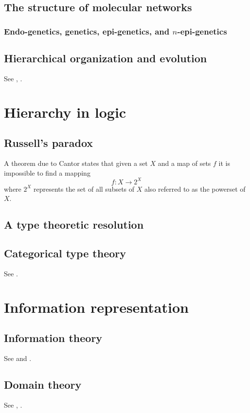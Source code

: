 \documentclass[aps,twocolumn]{revtex4}
\begin{document}
\subsection{The structure of molecular networks}
\subsubsection{Endo-genetics, genetics, epi-genetics, and $n$-epi-genetics}
\subsection{Hierarchical organization and evolution}
See \cite{Gould1994}, \cite{Arnold1982}.

\section{Hierarchy in logic}

\subsection{Russell's paradox}
A theorem due to Cantor states that given a set $X$ and a map of sets $f$ it is impossible to find a mapping $$ f: X \rightarrow 2^X $$ where $2^X$ represents the set of all subsets of $X$ also referred to as the powerset of $X$.

\subsection{A type theoretic resolution}

\subsection{Categorical type theory}
See \cite{Crole1994a}.

\section{Information representation}

\subsection{Information theory}
See \cite{Ellerman2008} and \cite{Cover2006}.

\subsection{Domain theory}
See \cite{Abramsky}, \cite{Abramsky1995}.
\end{document}
